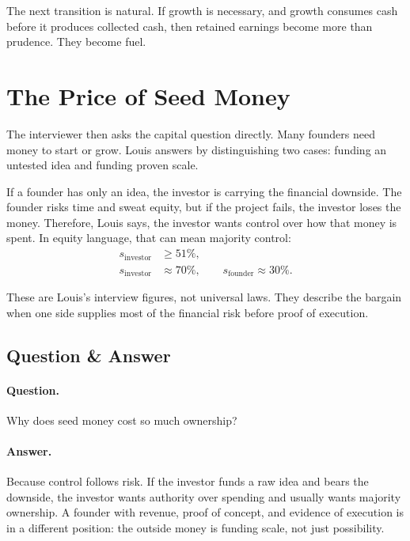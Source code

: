 The next transition is natural. If growth is necessary, and growth consumes cash before it produces collected cash, then retained earnings become more than prudence. They become fuel.

\section{The Price of Seed Money}

The interviewer then asks the capital question directly. Many founders need money to start or grow. Louis answers by distinguishing two cases: funding an untested idea and funding proven scale.

If a founder has only an idea, the investor is carrying the financial downside. The founder risks time and sweat equity, but if the project fails, the investor loses the money. Therefore, Louis says, the investor wants control over how that money is spent. In equity language, that can mean majority control:
\begin{align}
s_{\mathrm{investor}} &\geq 51\%,\\
s_{\mathrm{investor}} &\approx 70\%,
\qquad
s_{\mathrm{founder}} \approx 30\%.
\end{align}

These are Louis's interview figures, not universal laws. They describe the bargain when one side supplies most of the financial risk before proof of execution.

\subsection{Question \& Answer}

\paragraph{Question.} Why does seed money cost so much ownership?

\paragraph{Answer.} Because control follows risk. If the investor funds a raw idea and bears the downside, the investor wants authority over spending and usually wants majority ownership. A founder with revenue, proof of concept, and evidence of execution is in a different position: the outside money is funding scale, not just possibility.

